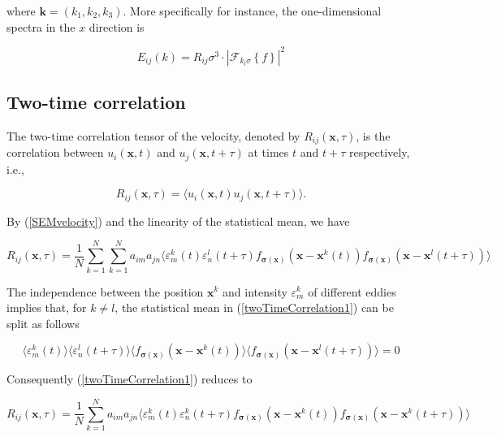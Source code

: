 \noindent where $\boldsymbol{k} = (k_1,k_2,k_3)$. More specifically for instance, the one-dimensional spectra in the $x$ direction is

\begin{equation}
E_{ij}(k) = R_{ij}\sigma^3 \cdot |\mathcal{F}_{k_l\sigma}\left\{f\right\}|^2
\end{equation}

\subsection{Two-time correlation}

The two-time correlation tensor of the velocity, denoted by $R_{ij}(\boldsymbol{x},\tau)$, is the correlation between $u_i(\boldsymbol{x},t)$ and $u_j(\boldsymbol{x},t+\tau)$ at times $t$ and $t + \tau$ respectively, i.e.,

\begin{equation} \label{twoTimeCorrelation0}
R_{ij}(\boldsymbol{x},\tau) = \langle u_i(\boldsymbol{x},t) u_j(\boldsymbol{x},t+\tau) \rangle.
\end{equation}

\noindent By (\ref{SEMvelocity}) and the linearity of the statistical mean, we have

\begin{equation} \label{twoTimeCorrelation1}
R_{ij}(\boldsymbol{x},\tau) = \frac{1}{N}\sum_{k=1}^N\sum_{k=1}^N a_{im}a_{jn} \langle \varepsilon_m^k(t) \varepsilon_n^l(t+\tau) f_{\boldsymbol{\sigma}(\boldsymbol{x})}(\boldsymbol{x}-\boldsymbol{x}^k(t)) f_{\boldsymbol{\sigma}(\boldsymbol{x})}(\boldsymbol{x}-\boldsymbol{x}^l(t+\tau)) \rangle 
\end{equation}

\noindent The independence between the position $\boldsymbol{x}^k$ and intensity $\varepsilon_m^k$ of different eddies implies that, for $k \neq l$, the statistical mean in (\ref{twoTimeCorrelation1}) can be split as follows

\begin{equation}
\langle \varepsilon_m^k(t) \rangle \langle \varepsilon_n^l(t+\tau) \rangle \langle f_{\boldsymbol{\sigma}(\boldsymbol{x})}(\boldsymbol{x}-\boldsymbol{x}^k(t)) \rangle \langle f_{\boldsymbol{\sigma}(\boldsymbol{x})}(\boldsymbol{x}-\boldsymbol{x}^l(t+\tau)) \rangle = 0
\end{equation}

\noindent Consequently (\ref{twoTimeCorrelation1}) reduces to

\begin{equation} \label{twoTimeCorrelation2}
R_{ij}(\boldsymbol{x},\tau) = \frac{1}{N}\sum_{k=1}^N a_{im}a_{jn} \langle \varepsilon_m^k(t) \varepsilon_n^k(t+\tau) f_{\boldsymbol{\sigma}(\boldsymbol{x})}(\boldsymbol{x}-\boldsymbol{x}^k(t)) f_{\boldsymbol{\sigma}(\boldsymbol{x})}(\boldsymbol{x}-\boldsymbol{x}^k(t+\tau)) \rangle 
\end{equation}

